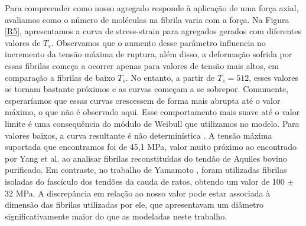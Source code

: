 \documentclass{report}
\begin{document}
        \indent Para compreender como nosso agregado responde à aplicação de uma força axial, avaliamos como o número de 
        moléculas na fibrila varia com a força. Na Figura \ref{R5}, apresentamos a curva de stress-strain para agregados 
        gerados com diferentes valores de \(T_{s}\). Observamos que o aumento desse parâmetro influencia no incremento da 
        tensão máxima de ruptura, além disso, a deformação sofrida por essas fibrilas começa a ocorrer apenas para valores 
        de tensão mais altos, em comparação a fibrilas de baixo \(T_{s}\). No entanto, a partir de \(T_{s} = 512\), esses 
        valores se tornam bastante próximos e as curvas começam a se sobrepor. Comumente, esperaríamos que essas curvas crescessem de forma mais abrupta até o valor
        máximo, o que não é observado aqui. Esse comportamento mais suave até o valor limite é uma consequência do módulo 
        de Weibull que utilizamos no modelo. Para valores baixos, a curva resultante é não determinística 
        \cite{Parkinson1997}. A tensão máxima suportada que encontramos foi de 45,1 MPa, valor muito próximo ao encontrado 
        por Yang et al. \cite{YANG2012148} ao analisar fibrilas reconstituídas do tendão de Aquiles bovino purificado. 
        Em contraste, no trabalho de Yamamoto \cite{Noritaka}, foram utilizadas fibrilas isoladas do fascículo dos tendões 
        da cauda de ratos, obtendo um valor de 100 \(\pm\) 32 MPa. A discrepância em relação ao nosso valor pode estar 
        associada à dimensão das fibrilas utilizadas por ele, que apresentavam um diâmetro significativamente maior do que 
        as modeladas neste trabalho.
\end{document}
